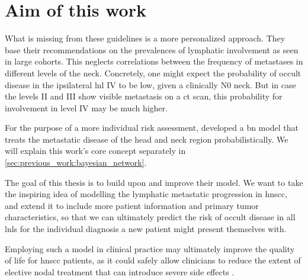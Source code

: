 \documentclass[\relativeRoot/main.tex]{subfiles}
\begin{document}
\section{Aim of this work}
\label{sec:intro:aim}

What is missing from these guidelines is a more personalized approach. They base their recommendations on the prevalences of lymphatic involvement as seen in large cohorts. This neglects correlations between the frequency of metastases in different levels of the neck. Concretely, one might expect the probability of occult disease in the ipsilateral \gls{lnl} IV to be low, given a clinically N0 neck. But in case the levels II and III show visible metastasis on a \gls{ct} scan, this probability for involvement in level IV may be much higher.

For the purpose of a more individual risk assessment,  developed a \gls{bn} model that treats the metastatic disease of the head and neck region probabilistically. We will explain this work's core concept separately in \cref{sec:previous_work:bayesian_network}.

The goal of this thesis is to build upon and improve their model. We want to take the inspiring idea of modelling the lymphatic metastatic progression in \gls{hnscc}, and extend it to include more patient information and primary tumor characteristics, so that we can ultimately predict the risk of occult disease in all \glspl{lnl} for the individual diagnosis a new patient might present themselves with.

Employing such a model in clinical practice may ultimately improve the quality of life for \gls{hnscc} patients, as it could safely allow clinicians to reduce the extent of elective nodal treatment that can introduce severe side effects \cite{batth_practical_2014}.
\end{document}
